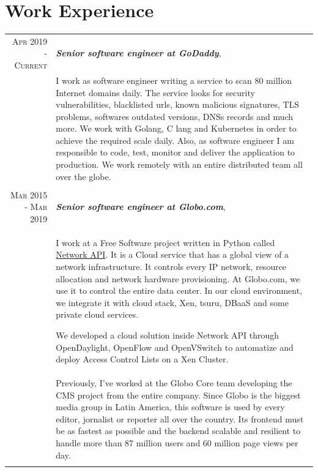 \documentclass[a4paper,10pt]{article} %
\begin{document}
\section{Work Experience}

\begin{longtable}{r|p{11cm}}

\textsc{Apr 2019 - Current} & \emph{\bf Senior software engineer at GoDaddy}, \\
& \footnotesize{I work as software engineer writing a service to scan
    80 million Internet domains daily. The service looks for security
    vulnerabilities, blacklisted urls, known malicious signatures,
    TLS problems, softwares outdated versions, DNSs records and much more.
    We work with Golang, C lang and Kubernetes in order to achieve the
    required scale daily. Also, as software engineer I am responsible to code,
    test, monitor and deliver the application to production.
    We work remotely with an entire distributed team all over the globe.} \\
\multicolumn{2}{c}{} \\

\textsc{Mar 2015 - Mar 2019} & \emph{\bf Senior software engineer at Globo.com}, \\
& \footnotesize{I work at a Free Software project written in Python called
	\href{https://github.com/globocom/GloboNetworkAPI}{Network API}.
    It is a Cloud service that has a global view of a network infrastructure.
    It controls every IP network, resource allocation and network
    hardware provisioning. At Globo.com, we use it to control the entire
    data center. In our cloud environment, we integrate it with cloud stack,
    Xen, tsuru, DBaaS and some private cloud services.

    We developed a cloud solution inside Network API through OpenDaylight,
    OpenFlow and OpenVSwitch to automatize and deploy Access Control Lists on a
    Xen Cluster.} \\

& \footnotesize{
    Previously, I've worked at the Globo Core team developing the CMS project
    from the entire company. Since Globo is the biggest media group in Latin
    America, this software is used by every editor, jornalist or reporter all
    over the country. Its frontend must be as fastest as possible and the
    backend scalable and resilient to handle more than 87 million users and 60
    million page views per day.} \\
\multicolumn{2}{c}{} \\


\end{longtable}
\end{document}
